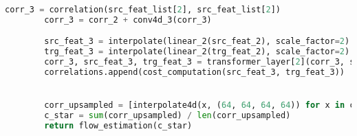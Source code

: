 \begin{algorithm*}[t]
\begin{lstlisting}[language=python]
        corr_3 = correlation(src_feat_list[2], src_feat_list[2])
        corr_3 = corr_2 + conv4d_3(corr_3)

        src_feat_3 = interpolate(linear_2(src_feat_2), scale_factor=2) + src_feats[2]
        trg_feat_3 = interpolate(linear_2(trg_feat_2), scale_factor=2) + trg_feats[2]
        corr_3, src_feat_3, trg_feat_3 = transformer_layer[2](corr_3, src_feat_3, trg_feat_3)
        correlations.append(cost_computation(src_feat_3, trg_feat_3))


        corr_upsampled = [interpolate4d(x, (64, 64, 64, 64)) for x in correlations]
        c_star = sum(corr_upsampled) / len(corr_upsampled)
        return flow_estimation(c_star)

\end{lstlisting}
\end{algorithm*}

\clearpage

